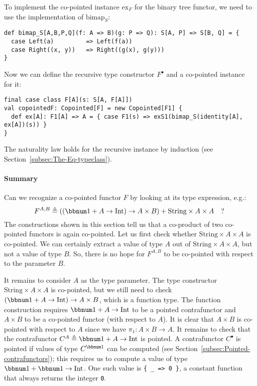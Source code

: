 To implement the co-pointed instance $\text{ex}_{F}$ for the binary
tree functor, we need to use the implementation of $\text{bimap}_{S}$:
\begin{lstlisting}
def bimap_S[A,B,P,Q](f: A => B)(g: P => Q): S[A, P] => S[B, Q] = {
  case Left(a)         => Left(f(a))
  case Right((x, y))   => Right((g(x), g(y)))
}
\end{lstlisting}
Now we can define the recursive type constructor $F^{\bullet}$ and
a co-pointed instance for it:
\begin{lstlisting}
final case class F[A](s: S[A, F[A]])
val copointedF: Copointed[F] = new Copointed[F1] {
  def ex[A]: F1[A] => A = { case F1(s) => exS1(bimap_S(identity[A], ex[A])(s)) }
}
\end{lstlisting}
The naturality law holds for the recursive instance by induction (see
Section~\ref{subsec:The-Eq-typeclass}).

\paragraph{Summary}

Can we recognize a co-pointed functor $F$ by looking at its type
expression, e.g.:
\[
F^{A,B}\triangleq\left(\left(\bbnum 1+A\rightarrow\text{Int}\right)\rightarrow A\times B\right)+\text{String}\times A\times A\quad?
\]
The constructions shown in this section tell us that a co-product
of two co-pointed functors is again co-pointed. Let us first check
whether $\text{String}\times A\times A$ is co-pointed. We can certainly
extract a value of type $A$ out of $\text{String}\times A\times A$,
but not a value of type $B$. So, there is no hope for $F^{A,B}$
to be co-pointed with respect to the parameter $B$.

It remains to consider $A$ as the type parameter. The type constructor
$\text{String}\times A\times A$ is co-pointed, but we still need
to check $\left(\bbnum 1+A\rightarrow\text{Int}\right)\rightarrow A\times B$,
which is a function type. The function construction requires $\bbnum 1+A\rightarrow\text{Int}$
to be a pointed contrafunctor and $A\times B$ to be a co-pointed
functor (with respect to $A$). It is clear that $A\times B$ is co-pointed
with respect to $A$ since we have $\pi_{1}:A\times B\rightarrow A$.
It remains to check that the contrafunctor $C^{A}\triangleq\bbnum 1+A\rightarrow\text{Int}$
is pointed. A contrafunctor $C^{\bullet}$ is pointed if values of
type $C^{\bbnum 1}$ can be computed (see Section~\ref{subsec:Pointed-contrafunctors});
this requires us to compute a value of type $\bbnum 1+\bbnum 1\rightarrow\text{Int}$.
One such value is \lstinline!{ _ => 0 }!, a constant function that
always returns the integer \lstinline!0!. 


